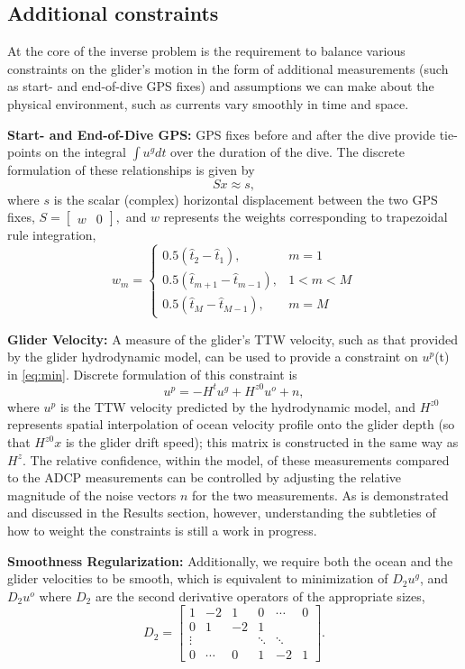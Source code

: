 \subsection {Additional constraints}
\label{sec:inverse.constraint}

At the core of the inverse problem is the requirement to balance various
constraints on the glider's motion in the form of additional measurements (such
as start- and end-of-dive GPS fixes) and assumptions we can make about the
physical environment, such as currents vary smoothly in time and space.


\textbf{Start- and End-of-Dive GPS:} GPS fixes before and after the dive provide tie-points on the integral $\int u^gdt$ over the duration of the dive. The discrete formulation of these relationships is given by 
$$
Sx\approx s,
$$
where $s$ is the scalar (complex) horizontal displacement between the two GPS fixes,
\(
S=\begin{bmatrix}w & 0\end{bmatrix},
\)
and $w$ represents the weights corresponding to trapezoidal rule integration, 
$$ w_m=\begin{cases}
0.5(\hat{t}_2-\hat{t}_1), &m=1\\
0.5(\hat{t}_{m+1}-\hat{t}_{m-1}), &1<m<M\\
0.5(\hat{t}_M-\hat{t}_{M-1}), &m=M
\end{cases}
$$

\textbf{Glider Velocity:} A measure of the glider's TTW velocity, such as that provided by the glider hydrodynamic model, can be used to provide a constraint on $u^p$(t) in \eqref{eq:min}. Discrete formulation of this constraint is 
\[
u^p = -H^t u^g + H^{z0} u^o + n, 
\]
where $u^{p}$ is the TTW velocity  predicted by the hydrodynamic model, and $H^{z0}$ represents spatial interpolation of ocean velocity profile onto the glider depth 
(so that  $H^{z0}  x$ is the glider drift speed); this matrix is constructed in the same way as $H^{z}$. The relative confidence, within the model, of these measurements compared to the ADCP measurements can be controlled by adjusting the relative magnitude of the noise vectors $n$ for the two measurements. As is demonstrated and discussed in the Results section, however, understanding the subtleties of how to weight the constraints is still a work in progress.

\textbf{Smoothness Regularization:}
\label{sec:inv.reg}
Additionally, we require both the ocean and the glider velocities to be smooth, which is equivalent to minimization of ${D_2u^g}$, and ${D_2u^o}$ where $D_2$ are the second derivative operators of the appropriate sizes,
$$D_2=\begin{bmatrix}
1 &-2 &1 &0 &\cdots &0\\
0 &1 &-2 &1 &\\
\vdots & & & \ddots &\ddots\\
0 &\cdots &0 &1 &-2 &1
\end{bmatrix}.
$$


